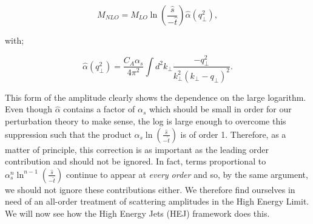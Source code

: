 \begin{equation}
M_{NLO} = M_{LO} \ln \left(\frac{\hat{s}}{-\hat{t}}\right) \hat{\alpha}(q_\perp^2),
\end{equation}

with;

\begin{equation}
\label{eqn:nlocorr}
\hat{\alpha}(q_\perp^2) = \frac{C_A \alpha_s}{4 \pi^2} \int d^2 k_\perp \frac{-q_\perp^2}{k_\perp^2(k_\perp - q_\perp)^2}.
\end{equation}

This form of the amplitude clearly shows the dependence on the large logarithm. Even though $\hat{\alpha}$ contains a factor of $\alpha_s$ which should be small in order for our perturbation theory to make sense, the log is large enough to overcome this suppression such that the product $\alpha_s \ln \left(\frac{\hat{s}}{-\hat{t}}\right)$ is of order 1. Therefore, as a matter of principle, this correction is as important as the leading order contribution and should not be ignored. In fact, terms proportional to $\alpha_s^n \ln^{n-1} \left(\frac{\hat{s}}{-\hat{t}}\right)$ continue to appear at \emph{every order} \cite{pomeronbook} and so, by the same argument, we should not ignore these contributions either. We therefore find ourselves in need of an all-order treatment of scattering amplitudes in the High Energy Limit. We will now see how the High Energy Jets (HEJ) framework does this. 


